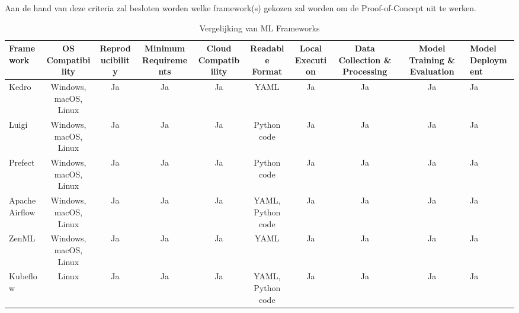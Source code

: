 Aan de hand van deze criteria zal besloten worden welke framework(s) gekozen zal worden om de Proof-of-Concept uit te werken.
\begin{table}[h]
    \caption{Vergelijking van ML Frameworks}
    \label{tab:ml_frameworks}
    \begin{tabular}{lcccccccc}
        \toprule
        Framework & OS Compatibility & Reproducibility & Minimum Requirements & Cloud Compatibility & Readable Format & Local Execution & Data Collection \& Processing & Model Training \& Evaluation & Model Deployment \\
        \midrule
        Kedro & Windows, macOS, Linux & Ja & Ja & Ja & YAML & Ja & Ja & Ja & Ja \\
        Luigi & Windows, macOS, Linux & Ja & Ja & Ja & Python code & Ja & Ja & Ja & Ja \\
        Prefect & Windows, macOS, Linux & Ja & Ja & Ja & Python code & Ja & Ja & Ja & Ja \\
        Apache Airflow & Windows, macOS, Linux & Ja & Ja & Ja & YAML, Python code & Ja & Ja & Ja & Ja \\
        ZenML & Windows, macOS, Linux & Ja & Ja & Ja & YAML & Ja & Ja & Ja & Ja \\
        Kubeflow & Linux & Ja & Ja & Ja & YAML, Python code & Ja & Ja & Ja & Ja \\
        \bottomrule
    \end{tabular}
\end{table}